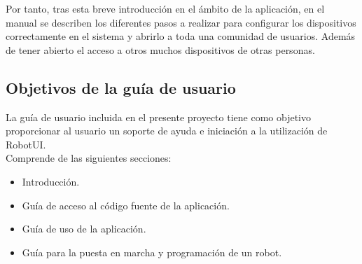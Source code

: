 \documentclass[a4paper,12pt]{article}
\begin{document}
Por tanto, tras esta breve introducción en el ámbito de la aplicación, en el manual se describen los diferentes pasos a realizar para configurar los dispositivos correctamente en el sistema
y abrirlo a toda una comunidad de usuarios. Además de tener abierto el acceso a otros muchos dispositivos de otras personas.\\

\subsection{ Objetivos de la guía de usuario }

La guía de usuario incluida en el presente proyecto tiene como objetivo proporcionar al usuario un soporte de ayuda e iniciación a la utilización de RobotUI.\\

Comprende de las siguientes secciones:\\

\begin{itemize}
 \item Introducción.
 \item Guía de acceso al código fuente de la aplicación.
 \item Guía de uso de la aplicación.
 \item Guía para la puesta en marcha y programación de un robot.
\end{itemize}

\clearpage
\nocite{*}

{}

\pagestyle{empty}
\end{document}
